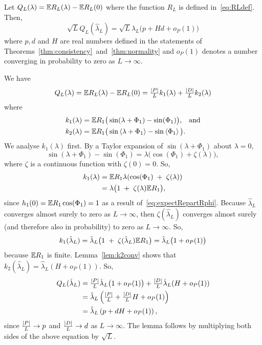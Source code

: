 \documentclass[journal]{IEEEtran}
\begin{document}
\begin{lemma}\label{lem:Qconv}
Let $Q_L(\lambda) = {\mathbb E} R_L(\lambda) - {\mathbb E} R_L(0)$ where the function $R_L$ is defined in~\eqref{eq:RLdef}.  Then,
\[ 
\sqrt{L} Q_L(\hat{\lambda}_L) = \sqrt{L} \hat{\lambda}_L\big( p + Hd  + o_P(1) \big)
\]
where $p, d$ and $H$ are real numbers defined in the statements of Theorems~\ref{thm:consistency}~and~\ref{thm:normality} and $o_P(1)$ denotes a number converging in probability to zero as $L\rightarrow\infty$.
\end{lemma}
\begin{IEEEproof}
We have
\[
Q_L(\lambda) = {\mathbb E} R_L(\lambda) - {\mathbb E} R_L(0) = \tfrac{{\vert P \vert}}{L} k_1(\lambda) + \tfrac{{\vert D \vert}}{L} k_2(\lambda)
\]
where
\begin{align}
k_1(\lambda) &= {\mathbb E} R_1\big( \sin(\lambda + \Phi_1) - \sin(\Phi_1) \big), \;\;\; \text{and} \nonumber\\
k_2(\lambda) &= {\mathbb E} R_1\big( \sin\left\langle \lambda + \Phi_1 \right\rangle - \sin\left\langle \Phi_1 \right\rangle \big). \label{eq:k2def}
\end{align}
We analyse $k_1(\lambda)$ first.  By a Taylor expansion of $\sin(\lambda + \Phi_1)$ about $\lambda = 0$,
\[
\sin(\lambda + \Phi_1) - \sin(\Phi_1) = \lambda \big( \cos(\Phi_1) + \zeta(\lambda) \big),
\]
where $\zeta$ is a continuous function with $\zeta(0) = 0$.  So,
\begin{align*}
k_1(\lambda) &= {\mathbb E} R_1\lambda(\cos(\Phi_1) \; + \; \zeta(\lambda)) \\
&= \lambda \big( 1 \; + \; \zeta(\lambda) {\mathbb E} R_1 \big),
\end{align*}
since $h_1(0) = {\mathbb E} R_1\cos(\Phi_1) = 1$ as a result of~\eqref{eq:expectRepartRphi}.  Because $\hat{\lambda}_L$ converges almost surely to zero as $L \rightarrow\infty$, then $\zeta(\hat{\lambda}_L)$ converges almost surely (and therefore also in probability) to zero as $L \rightarrow\infty$.  So, 
\[
k_1(\hat{\lambda}_L) = \hat{\lambda}_L \big( 1 \; + \; \zeta(\hat{\lambda}_L) {\mathbb E} R_1 \big) = \hat{\lambda}_L \big( 1  + o_P(1)\big)
\]
because ${\mathbb E} R_1$ is finite.  Lemma~\ref{lem:k2conv} shows that $k_2(\hat{\lambda}_L) = \hat{\lambda}_L ( H + o_P(1) )$.  So,
\begin{align*}
Q_L(\hat{\lambda}_L) &=  \tfrac{{\vert P \vert}}{L} \hat{\lambda}_L \big( 1  + o_P(1)\big)  + \tfrac{{\vert D \vert}}{L} \hat{\lambda}_L ( H + o_P(1) ) \\
&= \hat{\lambda}_L \left( \tfrac{{\vert P \vert}}{L}  + \tfrac{{\vert D \vert}}{L} H + o_P(1) \right) \\
&= \hat{\lambda}_L \left( p  + d H + o_P(1) \right),
\end{align*}
since $\frac{{\vert P \vert}}{L} \rightarrow p$ and $\frac{{\vert D \vert}}{L} \rightarrow d$ as $L \rightarrow \infty$.  The lemma follows by multiplying both sides of the above equation by $\sqrt{L}$.
\end{IEEEproof}
\end{document}
